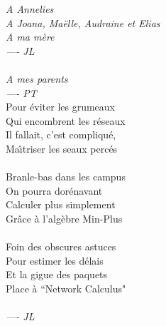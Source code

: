 \documentclass[11pt,twoside,onecolumn,a4paper]{book}
\begin{document}
\begin{titlepage}
 \begin{center}
 {\it
 A Annelies\\A Joana, Ma\"{e}lle, Audraine et Elias\\
 A ma m\`{e}re\\
 \hspace{1cm} ---- JL\\
 ~\\
 A mes parents\\
 \hspace{1cm} ---- PT\\
 }
 \vspace{7cm}
 Pour \'{e}viter les grumeaux\\
 Qui encombrent les r\'{e}seaux\\
 Il fallait, c'est compliqu\'{e},\\
 Ma\^{\i}triser les seaux perc\'{e}s\\
 ~\\
  Branle-bas dans les campus \\
  On pourra dor\'{e}navant\\
  Calculer plus simplement\\
 Gr\^{a}ce \`{a} l'alg\`{e}bre Min-Plus\\
 ~\\
  Foin des obscures astuces\\
 Pour estimer les d\'{e}lais\\
 Et la gigue des paquets\\
 Place \`{a} ``Network Calculus"\\
 ~\\
 {\it \hspace{2cm} ---- JL}
 \end{center}
\setcounter{page}{5}
\end{titlepage}
\end{document}
